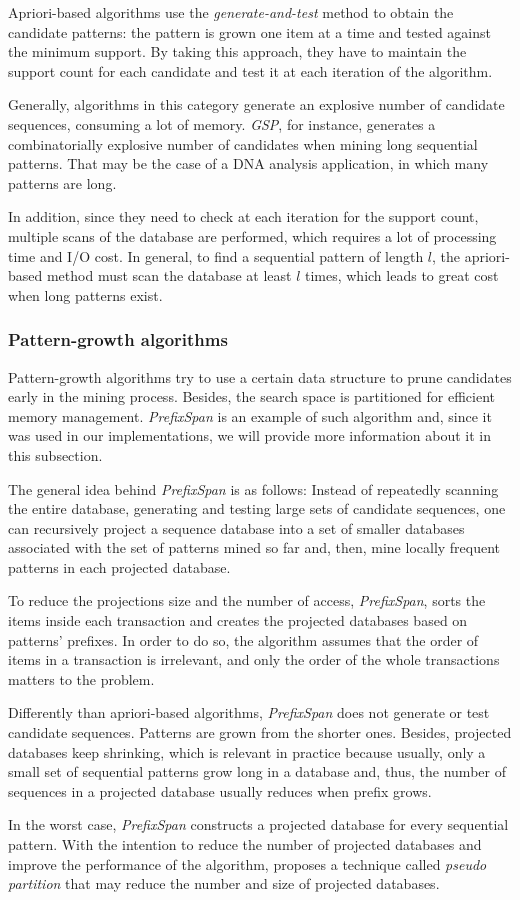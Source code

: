 Apriori-based algorithms use the \textit{generate-and-test} method to obtain the candidate patterns: the pattern is grown one item at a time and tested against the minimum support. By taking this approach, they have to maintain the support count for each candidate and test it at each iteration of the algorithm.

Generally, algorithms in this category generate an explosive number of candidate sequences, consuming a lot of memory. \textit{GSP}, for instance, generates a combinatorially explosive number of candidates when mining long sequential patterns. That may be the case of a DNA analysis application, in which many patterns are long.

In addition, since they need to check at each iteration for the support count, multiple scans of the database are performed, which requires a lot of processing time and I/O cost. In general, to find a sequential pattern of length $l$, the apriori-based method must scan the database at least $l$ times, which leads to great cost when long patterns exist.

\subsubsection{Pattern-growth algorithms}

Pattern-growth algorithms try to use a certain data structure to prune candidates early in the mining process. Besides, the search space is partitioned for efficient memory management. \textit{PrefixSpan}\cite{Pei} is an example of such algorithm and, since it was used in our implementations, we will provide more information about it in this subsection.

The general idea behind \textit{PrefixSpan} is as follows: Instead of repeatedly scanning the entire database, generating and testing large sets of candidate sequences, one can recursively project a sequence database into a set of smaller databases associated with the set of patterns mined so far and, then, mine locally frequent patterns in each projected database\cite{Pei}.

To reduce the projections size and the number of access, \textit{PrefixSpan}, sorts the items inside each transaction and creates the projected databases based on patterns' prefixes. In order to do so, the algorithm assumes that the order of items in a transaction is irrelevant, and only the order of the whole transactions matters to the problem.

Differently than apriori-based algorithms, \textit{PrefixSpan} does not generate or test candidate sequences. Patterns are grown from the shorter ones. Besides, projected databases keep shrinking, which is relevant in practice because usually, only a small set of sequential patterns grow long in a database and, thus, the number of sequences in a projected database usually reduces when prefix grows.

In the worst case, \textit{PrefixSpan} constructs a projected database for every sequential pattern. With the intention to reduce the number of projected databases and improve the performance of the algorithm, \cite{Pei} proposes a technique called \textit{pseudo partition} that may reduce the number and size of projected databases.

